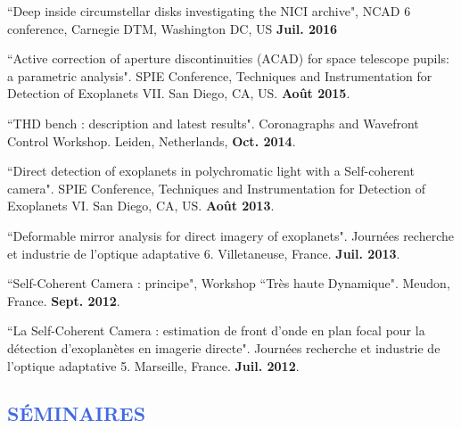 \documentclass[11pt,a4paper, french]{article}
\begin{document}
\begin{etaremune}
\item ``Deep inside circumstellar disks investigating the NICI archive", NCAD 6 conference, Carnegie DTM, Washington DC, US \textbf{Juil. 2016}

\item ``Active correction of aperture discontinuities (ACAD) for space telescope pupils: a parametric analysis". SPIE Conference, Techniques and Instrumentation for Detection of Exoplanets VII. San Diego, CA, US. \textbf{Août 2015}.

\item ``THD bench : description and latest results". Coronagraphs and Wavefront Control Workshop. Leiden, Netherlands, \textbf{Oct. 2014}.

\item ``Direct detection of exoplanets in polychromatic light with a Self-coherent camera". SPIE Conference, Techniques and Instrumentation for Detection of Exoplanets VI. San Diego, CA, US. \textbf{Août 2013}.

\item ``Deformable mirror analysis for direct imagery of exoplanets". Journées recherche et industrie de l’optique adaptative 6. Villetaneuse, France. \textbf{Juil. 2013}.

\item ``Self-Coherent Camera : principe", Workshop ``Très haute Dynamique". Meudon, France. \textbf{Sept. 2012}.

\item ``La Self-Coherent Camera : estimation de front d'onde en plan focal pour la détection d'exoplanètes en imagerie directe". Journées recherche et industrie de l'optique adaptative 5. Marseille, France. \textbf{Juil. 2012}.
\end{etaremune}

\vspace{-0.8cm}
\textcolor{RoyalBlue}{\subsection{\large SÉMINAIRES}}
\end{document}
